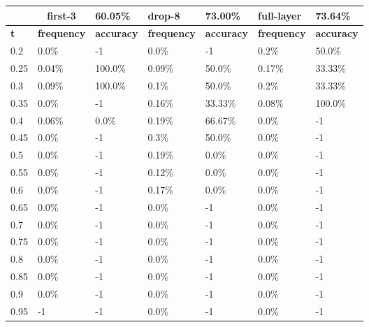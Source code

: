
\begin{table}[t]
\centering
\begin{tabular}{lllllll}
\hline
\multicolumn{1}{c}{} & \multicolumn{1}{c}{first-3} & \multicolumn{1}{l|}{60.05\%} & drop-8 & \multicolumn{1}{l|}{73.00\%} & full-layer & 73.64\% \\ \hline
\multicolumn{1}{l|}{\textbf{t}} & \textbf{frequency} & \multicolumn{1}{l|}{\textbf{accuracy}} & \textbf{frequency} & \multicolumn{1}{l|}{\textbf{accuracy}} & \textbf{frequency} & \textbf{accuracy} \\ \hline	\multicolumn{1}{l|}{0.2}&  0.0\% & \multicolumn{1}{l|}{-1}& 0.0\% & \multicolumn{1}{l|}{-1}& 0.2\% & 50.0\%\\ 
\multicolumn{1}{l|}{0.25}&  0.04\% & \multicolumn{1}{l|}{100.0\%}& 0.09\% & \multicolumn{1}{l|}{50.0\%}& 0.17\% & 33.33\%\\ 
\multicolumn{1}{l|}{0.3}&  0.09\% & \multicolumn{1}{l|}{100.0\%}& 0.1\% & \multicolumn{1}{l|}{50.0\%}& 0.2\% & 33.33\%\\ 
\multicolumn{1}{l|}{0.35}&  0.0\% & \multicolumn{1}{l|}{-1}& 0.16\% & \multicolumn{1}{l|}{33.33\%}& 0.08\% & 100.0\%\\ 
\multicolumn{1}{l|}{0.4}&  0.06\% & \multicolumn{1}{l|}{0.0\%}& 0.19\% & \multicolumn{1}{l|}{66.67\%}& 0.0\% & -1\\ 
\multicolumn{1}{l|}{0.45}&  0.0\% & \multicolumn{1}{l|}{-1}& 0.3\% & \multicolumn{1}{l|}{50.0\%}& 0.0\% & -1\\ 
\multicolumn{1}{l|}{0.5}&  0.0\% & \multicolumn{1}{l|}{-1}& 0.19\% & \multicolumn{1}{l|}{0.0\%}& 0.0\% & -1\\ 
\multicolumn{1}{l|}{0.55}&  0.0\% & \multicolumn{1}{l|}{-1}& 0.12\% & \multicolumn{1}{l|}{0.0\%}& 0.0\% & -1\\ 
\multicolumn{1}{l|}{0.6}&  0.0\% & \multicolumn{1}{l|}{-1}& 0.17\% & \multicolumn{1}{l|}{0.0\%}& 0.0\% & -1\\ 
\multicolumn{1}{l|}{0.65}&  0.0\% & \multicolumn{1}{l|}{-1}& 0.0\% & \multicolumn{1}{l|}{-1}& 0.0\% & -1\\ 
\multicolumn{1}{l|}{0.7}&  0.0\% & \multicolumn{1}{l|}{-1}& 0.0\% & \multicolumn{1}{l|}{-1}& 0.0\% & -1\\ 
\multicolumn{1}{l|}{0.75}&  0.0\% & \multicolumn{1}{l|}{-1}& 0.0\% & \multicolumn{1}{l|}{-1}& 0.0\% & -1\\ 
\multicolumn{1}{l|}{0.8}&  0.0\% & \multicolumn{1}{l|}{-1}& 0.0\% & \multicolumn{1}{l|}{-1}& 0.0\% & -1\\ 
\multicolumn{1}{l|}{0.85}&  0.0\% & \multicolumn{1}{l|}{-1}& 0.0\% & \multicolumn{1}{l|}{-1}& 0.0\% & -1\\ 
\multicolumn{1}{l|}{0.9}&  0.0\% & \multicolumn{1}{l|}{-1}& 0.0\% & \multicolumn{1}{l|}{-1}& 0.0\% & -1\\ 
\multicolumn{1}{l|}{0.95}&  -1 & \multicolumn{1}{l|}{-1}& 0.0\% & \multicolumn{1}{l|}{-1}& 0.0\% & -1\\ 


\end{tabular}
\end{table}
